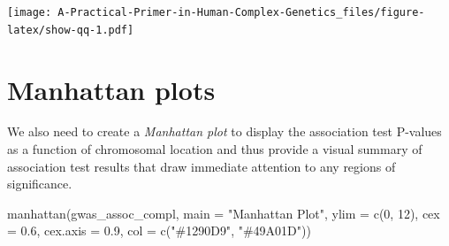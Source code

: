 \documentclass[
]{book}
\newenvironment{Shaded}{\begin{snugshade}}{\end{snugshade}}
\newcommand{\AttributeTok}[1]{\textcolor[rgb]{0.77,0.63,0.00}{#1}}
\newcommand{\DecValTok}[1]{\textcolor[rgb]{0.00,0.00,0.81}{#1}}
\newcommand{\FloatTok}[1]{\textcolor[rgb]{0.00,0.00,0.81}{#1}}
\newcommand{\FunctionTok}[1]{\textcolor[rgb]{0.00,0.00,0.00}{#1}}
\newcommand{\NormalTok}[1]{#1}
\newcommand{\OtherTok}[1]{\textcolor[rgb]{0.56,0.35,0.01}{#1}}
\newcommand{\SpecialCharTok}[1]{\textcolor[rgb]{0.00,0.00,0.00}{#1}}
\newcommand{\StringTok}[1]{\textcolor[rgb]{0.31,0.60,0.02}{#1}}
\begin{document}
\begin{Shaded}
\end{Shaded}

\texttt{[image: A-Practical-Primer-in-Human-Complex-Genetics\_files/figure-latex/show-qq-1.pdf]}

\hypertarget{manhattan-plots}{%
\section{Manhattan plots}\label{manhattan-plots}}

We also need to create a \emph{Manhattan plot} to display the association test P-values as a function of chromosomal location and thus provide a visual summary of association test results that draw immediate attention to any regions of significance.

\begin{Shaded}
\begin{Highlighting}[]
\FunctionTok{manhattan}\NormalTok{(gwas\_assoc\_compl, }\AttributeTok{main =} \StringTok{"Manhattan Plot"}\NormalTok{,}
          \AttributeTok{ylim =} \FunctionTok{c}\NormalTok{(}\DecValTok{0}\NormalTok{, }\DecValTok{12}\NormalTok{),}
          \AttributeTok{cex =} \FloatTok{0.6}\NormalTok{, }\AttributeTok{cex.axis =} \FloatTok{0.9}\NormalTok{,}
          \AttributeTok{col =} \FunctionTok{c}\NormalTok{(}\StringTok{"\#1290D9"}\NormalTok{, }\StringTok{"\#49A01D"}\NormalTok{))}
\end{Highlighting}
\end{Shaded}
\end{document}
